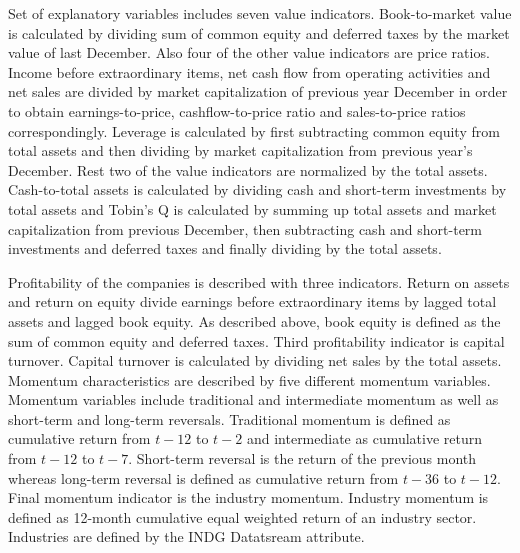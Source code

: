 \documentclass{article}
\begin{document}
Set of explanatory variables includes seven value indicators. Book-to-market value is calculated by dividing sum of common equity and deferred taxes by the market value of last December. Also four of the other value indicators are price ratios. Income before extraordinary items, net cash flow from operating activities and net sales are divided by market capitalization of previous year December in order to obtain earnings-to-price, cashflow-to-price ratio and sales-to-price ratios correspondingly. Leverage is calculated by first subtracting common equity from total assets and then dividing by market capitalization from previous year's December. Rest two of the value indicators are normalized by the total assets. Cash-to-total assets is calculated by dividing cash and short-term investments by total assets and Tobin's Q is calculated by summing up total assets and market capitalization from previous December, then subtracting cash and short-term investments and deferred taxes and finally dividing by the total assets. \par

Profitability of the companies is described with three indicators. Return on assets and return on equity divide earnings before extraordinary items by lagged total assets and lagged book equity. As described above, book equity is defined as the sum of common equity and deferred taxes. Third profitability indicator is capital turnover. Capital turnover is calculated by dividing net sales by the total assets. Momentum characteristics are described by five different momentum variables. Momentum variables include traditional and intermediate momentum as well as short-term and long-term reversals. Traditional momentum is defined as cumulative return from $t-12$ to $t-2$ and intermediate as cumulative return from $t-12$ to $t-7$. Short-term reversal is the return of the previous month whereas long-term reversal is defined as cumulative return from $t-36$ to $t-12$. Final momentum indicator is the industry momentum. Industry momentum is defined as 12-month cumulative equal weighted return of an industry sector. Industries are defined by the INDG Datatsream attribute. \par
\end{document}
